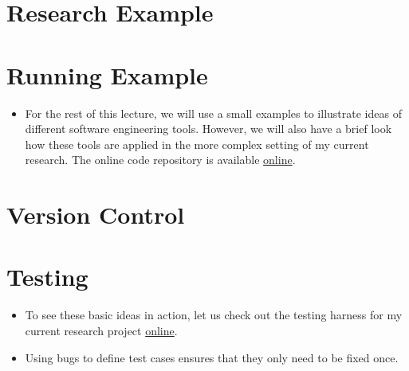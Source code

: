 \section{Research Example}


\section{Running Example}
\begin{itemize}
\item For the rest of this lecture, we will use a small examples to illustrate ideas of different software engineering tools. However, we will also have a brief look how these tools are applied in the more complex setting of my current research. The online code repository is available \href{https://github.com/robustToolbox/package}{online}.
\end{itemize}

\section{Version Control}

\nocite{Bilschak.2016}

\section{Testing}
\begin{itemize}
\item To see these basic ideas in action, let us check out the testing harness for my current research project \href{https://github.com/robustToolbox/package/tree/master/development/tests}{online}.
\item Using bugs to define test cases ensures that they only need to be fixed once.
\end{itemize}


